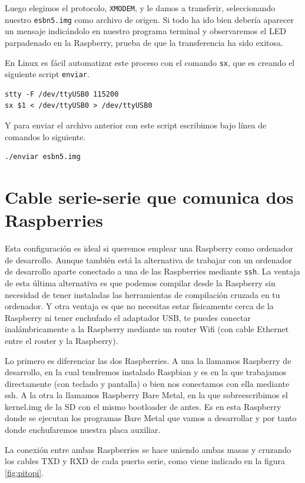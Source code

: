 Luego elegimos el protocolo, {\tt XMODEM}, y le damos a transferir, seleccionando
nuestro {\tt esbn5.img} como archivo de origen. Si todo ha ido bien debería aparecer
un mensaje indicándolo en nuestro programa terminal y observaremos el LED parpadenado
en la Raspberry, prueba de que la transferencia ha sido exitosa.

En Linux es fácil automatizar este proceso con el comando {\tt sx}, que es creando
el siguiente script {\tt enviar}.

\begin{lstlisting}
stty -F /dev/ttyUSB0 115200
sx $1 < /dev/ttyUSB0 > /dev/ttyUSB0
\end{lstlisting}

Y para enviar el archivo anterior con este script escribimos bajo línea de comandos lo siguiente.

\begin{lstlisting}
./enviar esbn5.img
\end{lstlisting}

\section{Cable serie-serie que comunica dos Raspberries}

Esta configuración es ideal si queremos emplear una Raspberry como ordenador de desarrollo.
Aunque también está la alternativa de trabajar con un ordenador de desarrollo aparte conectado
a una de las Raspberries mediante {\tt ssh}. La ventaja de esta última alternativa es que podemos
compilar desde la Raspberry sin necesidad de tener instaladas las herramientas de compilación
cruzada en tu ordenador. Y otra ventaja es que no necesitas estar físicamente cerca de la
Raspberry ni tener enchufado el adaptador USB, te puedes conectar inalámbricamente a la Raspberry
mediante un router Wifi (con cable Ethernet entre el router y la Raspberry).

Lo primero es diferenciar las dos Raspberries. A una la llamamos Raspberry de desarrollo,
en la cual tendremos instalado Raspbian y es en la que trabajamos directamente (con teclado y
pantalla) o bien nos conectamos con ella mediante ssh. A la otra la llamamos Raspberry Bare
Metal, en la que sobreescribimos el kernel.img de la SD con el mismo bootloader de antes. Es
en esta Raspberry donde se ejecutan los programas Bare Metal que vamos a desarrollar y por tanto
donde enchufaremos nuestra placa auxiliar.

La conexión entre ambas Raspberries se hace uniendo ambas masas y cruzando los cables TXD
y RXD de cada puerto serie, como viene indicado en la figura \ref{fig:pitopi}.

